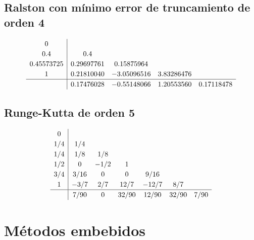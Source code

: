     \subsection{Ralston con mínimo error de truncamiento de orden 4}
    \vspace{-10pt}
        \begin{equation}\label{eq:ralston4}
            \renewcommand\arraystretch{1.2}
            \begin{array}{c|cccc}
            0\\
            0.4 & 0.4\\
            0.45573725 & 0.29697761 & 0.15875964\\
            1 & 0.21810040 & -3.05096516 & 3.83286476\\
            \hline
            & 0.17476028 & -0.55148066 & 1.20553560 & 0.17118478
            \end{array}
        \end{equation}

    \subsection{Runge-Kutta de orden 5}
    \vspace{-10pt}
        \begin{equation}\label{eq:rk5}
            \renewcommand\arraystretch{1.2}
            \begin{array}{c|cccccc}
            0\\
            1/4 & 1/4\\
            1/4 & 1/8 & 1/8\\
            1/2 & 0 & -1/2 & 1\\
            3/4 & 3/16 & 0 & 0 & 9/16 \\
            1 & -3/7 & 2/7 & 12/7 & -12/7 & 8/7 \\
            \hline
            & 7/90 & 0 & 32/90 & 12/90 & 32/90 & 7/90
            \end{array}
        \end{equation}
    
    \vspace{-10pt}

    \section*{Métodos embebidos}
    
    \vfill
    
